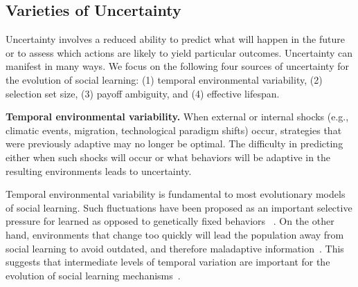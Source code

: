 \documentclass[letterpaper,11.5pt]{scrartcl}
\newcommand{\mt}[1]{{\textcolor{myorange} {({\tiny MT:} #1)}}}
\begin{document}

\subsection{Varieties of Uncertainty}

Uncertainty involves a reduced ability to predict what will happen in the future or to assess which actions are likely to yield particular outcomes. Uncertainty can manifest in many ways. We focus on the following four sources of uncertainty for the evolution of social learning: (1) temporal environmental variability, (2) selection set size, (3) payoff ambiguity, and (4) effective lifespan.

\textbf{Temporal environmental variability.} When external or internal shocks
(e.g., climatic events, migration, technological paradigm shifts) occur,
strategies that were previously adaptive may no longer be optimal. The difficulty
in predicting either when such shocks will occur or what behaviors will be
adaptive in the resulting environments leads to uncertainty. 

Temporal environmental variability is fundamental to most evolutionary models of
social learning. Such fluctuations have been proposed as an important selective
pressure for learned as opposed to genetically fixed behaviors
~\cite{Richerson2000}. On the other hand, environments that change too quickly
will lead the population away from social learning to avoid outdated, 
and therefore maladaptive information~\cite{Feldman1996,
BoydRicherson1985}. This suggests that intermediate levels of temporal variation
are important for the evolution of social learning mechanisms~\cite{aoki2005}.
\end{document}

